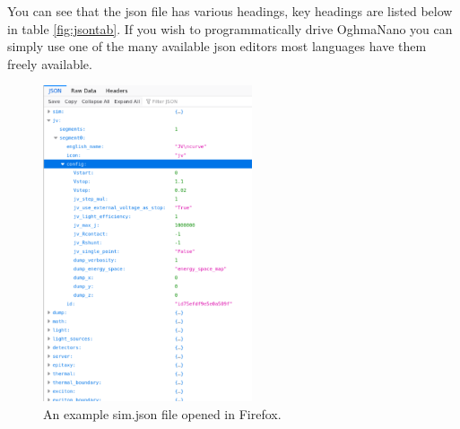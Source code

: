 You can see that the json file has various headings, key headings are listed below in table \ref{fig:jsontab}. If you wish to programmatically drive OghmaNano you can simply use one of the many available json editors most languages have them freely available.

\begin{figure}
\centering
\includegraphics[width=0.55\textwidth]{./images/json_firefox.png}
\caption{An example sim.json file opened in Firefox.}
\label{fig:jsonfirefox}
\end{figure}

